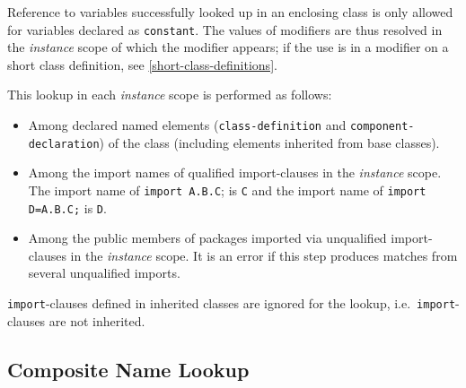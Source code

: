 Reference to variables successfully looked up in an enclosing class is only allowed for variables declared as \lstinline!constant!.  The values of modifiers are thus resolved in the \emph{instance} scope of which the modifier appears; if the use is in a modifier on a short class definition, see \cref{short-class-definitions}.

This lookup in each \emph{instance} scope is performed as follows:
\begin{itemize}
\item
  Among declared named elements (\lstinline!class-definition! and \lstinline!component-declaration!) of the class (including elements inherited from base classes).
\item
  Among the import names of qualified import-clauses in the \emph{instance} scope.  The import name of \lstinline!import A.B.C!; is \lstinline!C! and the import name of \lstinline!import D=A.B.C;! is \lstinline!D!.
\item
  Among the public members of packages imported via unqualified import-clauses in the \emph{instance} scope.  It is an error if this step produces matches from several unqualified imports.
\end{itemize}

\lstinline!import!-clauses defined in inherited classes are ignored for the lookup, i.e.\ \lstinline!import!-clauses are not inherited.

\subsection{Composite Name Lookup}\label{composite-name-lookup}

